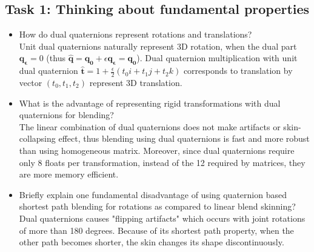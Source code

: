 \documentclass[paper=a4, fontsize=11pt]{scrartcl} %
\numberwithin{equation}{section} %
\numberwithin{figure}{section} %
\numberwithin{table}{section} %
\renewcommand{\vec}[1]{\mathbf{#1}}
\begin{document}
\subsection{Task 1: Thinking about fundamental properties}

\begin{itemize}
	\item How do dual quaternions represent rotations and translations? \\

Unit dual quaternions naturally represent 3D rotation, when the dual part $\vec{q_\epsilon} = 0$ (thus $\hat{\vec{q}} = \vec{q_0} + \epsilon \vec{q_\epsilon} = \vec{q_0}$). Dual quaternion multiplication with unit dual quaternion $\hat{\vec{t}} = 1 + \frac{\epsilon}{2}(t_0 i + t_1 j + t_2 k)$ corresponds to translation by vector $(t_0, t_1, t_2)$ represent 3D translation.\\
	
	\item What is the advantage of representing rigid transformations with dual quaternions for blending? \\
	
The linear combination of dual quaternions does not make artifacts or skin-collapsing effect, thus blending using dual quaternions is fast and more robust than using homogeneous matrix. Moreover, since dual quaternions require only 8 floats per transformation, instead of the 12 required by matrices, they are more memory efficient.\\
	
	\item Briefly explain one fundamental disadvantage of using quaternion based shortest path blending for rotations as compared to linear blend skinning? \\
	
Dual quaternions causes "flipping artifacts" which occurs with joint rotations of more than 180 degrees. Because of its shortest path property, when the other path becomes shorter, the skin changes its shape discontinuously. \\

\end{itemize}


\end{document}

